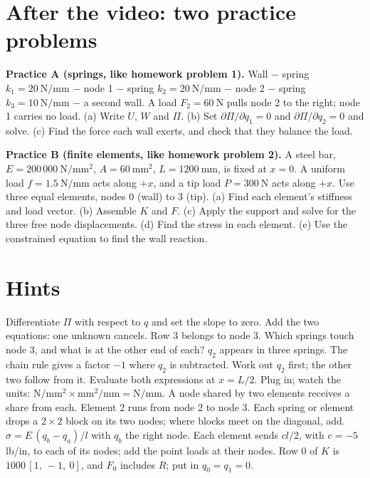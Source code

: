 \documentclass[11pt]{article}
\newcommand{\mm}{\ \mathrm{mm}}
\newcommand{\Nmm}{\ \mathrm{N/mm}}
\begin{document}

\section*{After the video: two practice problems}\label{practice}

\textbf{Practice A (springs, like homework problem 1).} Wall $-$ spring $k_1 = 20\Nmm$ $-$ node 1 $-$ spring
$k_2 = 20\Nmm$ $-$ node 2 $-$ spring $k_3 = 10\Nmm$ $-$ a second wall. A load $F_2 = 60\ \mathrm{N}$ pulls node 2 to
the right; node 1 carries no load. (a) Write $U$, $W$ and $\Pi$. (b) Set $\partial\Pi/\partial q_1 = 0$ and
$\partial\Pi/\partial q_2 = 0$ and solve. (c) Find the force each wall exerts, and check that they balance the load.

\textbf{Practice B (finite elements, like homework problem 2).} A steel bar, $E = 200\,000\ \mathrm{N/mm^2}$,
$A = 60\mm^2$, $L = 1200\mm$, is fixed at $x = 0$. A uniform load $f = 1.5\Nmm$ acts along $+x$, and a tip load
$P = 300\ \mathrm{N}$ acts along $+x$. Use three equal elements, nodes 0 (wall) to 3 (tip). (a) Find each element's stiffness and load vector.
(b) Assemble $K$ and $F$. (c) Apply the support and solve for the three free node displacements. (d) Find the stress
in each element. (e) Use the constrained equation to find the wall reaction.

\newpage
\section*{Hints}\label{hints}
 Differentiate $\Pi$ with respect to $q$ and set the slope to zero.
 Add the two equations: one unknown cancels.
 Row 3 belongs to node 3. Which springs touch node 3, and what is at the other end of each?
 $q_2$ appears in three springs. The chain rule gives a factor $-1$ where $q_2$ is subtracted.
 Work out $q_2$ first; the other two follow from it.
 Evaluate both expressions at $x = L/2$.
 Plug in; watch the units: $\mathrm{N/mm^2}\times\mathrm{mm^2}/\mathrm{mm} = \mathrm{N/mm}$.
 A node shared by two elements receives a share from each.
 Element 2 runs from node 2 to node 3.
 Each spring or element drops a $2\times2$ block on its two nodes; where blocks meet on the diagonal,
add.
 $\sigma = E\,(q_b - q_a)/l$ with $q_b$ the right node.
 Each element sends $cl/2$, with $c = -5$ lb/in, to each of its nodes; add the point loads at their nodes.
 Row 0 of $K$ is $1000\,[1,\ -1,\ 0]$, and $F_0$ includes $R$; put in $q_0 = q_1 = 0$.
\end{document}
